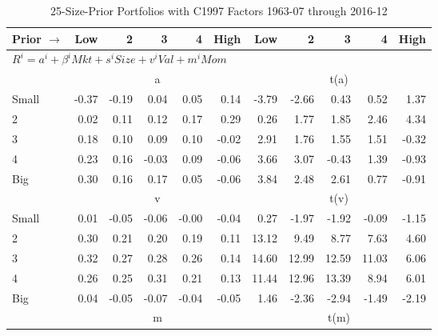 
\begin{table}[!ht]
\centering
\caption{25-Size-Prior Portfolios with C1997 Factors 1963-07 through 2016-12}
\begin{tabular}{lrrrrrrrrrr}
  \toprule
    Prior $\rightarrow$ & Low & 2 & 3 & 4 & High & Low & 2 & 3 & 4 & High \\ 
  \midrule
  \multicolumn{11}{l}{$R^i=a^i+\beta^iMkt+s^iSize+v^iVal+m^iMom$} \\

  
    
      & \multicolumn{5}{c}{a} & \multicolumn{5}{c}{t(a)}
    
    \\
      \cmidrule(r){2-6} \cmidrule(r){7-11}

    Small   & -0.37  & -0.19  & 0.04  & 0.05  & 0.14  & -3.79  & -2.66  & 0.43  & 0.52  & 1.37  \\
         2  & 0.02  & 0.11  & 0.12  & 0.17  & 0.29  & 0.26  & 1.77  & 1.85  & 2.46  & 4.34  \\
         3  & 0.18  & 0.10  & 0.09  & 0.10  & -0.02  & 2.91  & 1.76  & 1.55  & 1.51  & -0.32  \\
         4  & 0.23  & 0.16  & -0.03  & 0.09  & -0.06  & 3.66  & 3.07  & -0.43  & 1.39  & -0.93  \\
    Big     & 0.30  & 0.16  & 0.17  & 0.05  & -0.06  & 3.84  & 2.48  & 2.61  & 0.77  & -0.91  \\

  
    
      & \multicolumn{5}{c}{v} & \multicolumn{5}{c}{t(v)}
    
    \\
      \cmidrule(r){2-6} \cmidrule(r){7-11}

    Small   & 0.01  & -0.05  & -0.06  & -0.00  & -0.04  & 0.27  & -1.97  & -1.92  & -0.09  & -1.15  \\
         2  & 0.30  & 0.21  & 0.20  & 0.19  & 0.11  & 13.12  & 9.49  & 8.77  & 7.63  & 4.60  \\
         3  & 0.32  & 0.27  & 0.28  & 0.26  & 0.14  & 14.60  & 12.99  & 12.59  & 11.03  & 6.06  \\
         4  & 0.26  & 0.25  & 0.31  & 0.21  & 0.13  & 11.44  & 12.96  & 13.39  & 8.94  & 6.01  \\
    Big     & 0.04  & -0.05  & -0.07  & -0.04  & -0.05  & 1.46  & -2.36  & -2.94  & -1.49  & -2.19  \\

  
    
      & \multicolumn{5}{c}{m} & \multicolumn{5}{c}{t(m)}
    

\end{tabular}
\end{table}

